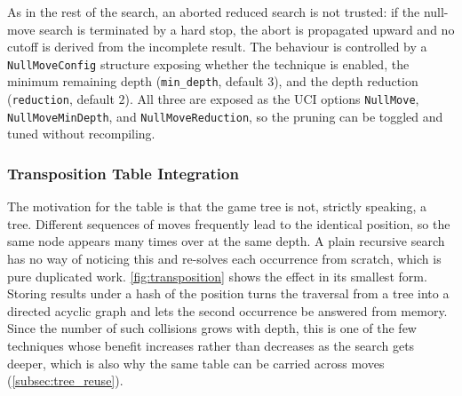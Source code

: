As in the rest of the search, an aborted reduced search is not trusted: if the
null-move search is terminated by a hard stop, the abort is propagated upward and
no cutoff is derived from the incomplete result. The behaviour is controlled by a
\texttt{NullMoveConfig} structure exposing whether the technique is enabled, the
minimum remaining depth (\texttt{min\_depth}, default $3$), and the depth
reduction (\texttt{reduction}, default $2$). All three are exposed as the UCI
options \texttt{NullMove}, \texttt{NullMoveMinDepth}, and
\texttt{NullMoveReduction}, so the pruning can be toggled and tuned without
recompiling.

\subsubsection{Transposition Table Integration}

The motivation for the table is that the game tree is not, strictly speaking, a
tree. Different sequences of moves frequently lead to the identical position, so
the same node appears many times over at the same depth. A plain recursive search
has no way of noticing this and re-solves each occurrence from scratch, which is
pure duplicated work. \cref{fig:transposition} shows the effect in its smallest
form. Storing results under a hash of the position turns the traversal from a
tree into a directed acyclic graph and lets the second occurrence be answered
from memory. Since the number of such collisions grows with depth, this is one of
the few techniques whose benefit increases rather than decreases as the search
gets deeper, which is also why the same table can be carried across moves
(\cref{subsec:tree_reuse}).

